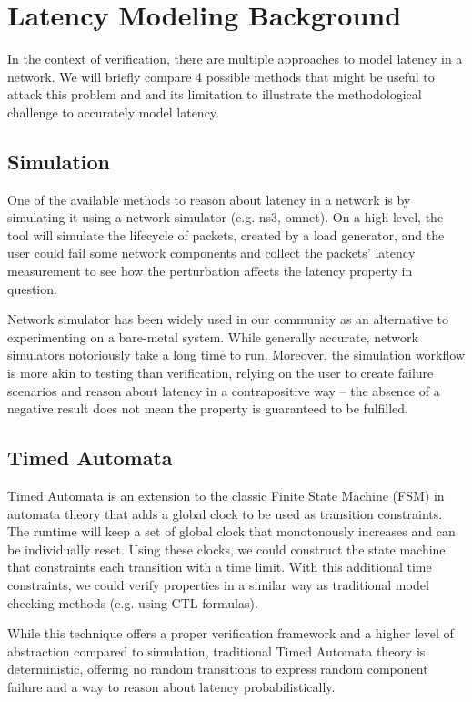 \section{Latency Modeling Background}
In the context of verification, there are multiple approaches to model latency in a network.
We will briefly compare 4 possible methods that might be useful to attack this problem and 
and its limitation to illustrate the methodological challenge to accurately model latency.

\subsection{Simulation}
One of the available methods to reason about latency in a network is by simulating it 
using a network simulator (e.g. ns3, omnet).
On a high level, the tool will simulate the lifecycle of packets, created by a load generator, 
and the user could fail some network components and collect the packets' latency measurement 
to see how the perturbation affects the latency property in question.

Network simulator has been widely used in our community as an alternative to experimenting on 
a bare-metal system. 
While generally accurate, network simulators notoriously take a long time to run.
Moreover, the simulation workflow is more akin to testing than verification, relying on 
the user to create failure scenarios and reason about latency in a contrapositive way -- 
the absence of a negative result does not mean the property is guaranteed to be fulfilled.

\subsection{Timed Automata}
Timed Automata is an extension to the classic Finite State Machine (FSM) in automata theory that 
adds a global clock to be used as transition constraints. 
The runtime will keep a set of global clock that monotonously increases and can be individually 
reset.
Using these clocks, we could construct the state machine that constraints each transition with 
a time limit. 
With this additional time constraints, we could verify properties in a similar way 
as traditional model checking methods (e.g. using CTL formulas).

While this technique offers a proper verification framework and a higher level of abstraction 
compared to simulation, traditional Timed Automata theory is deterministic, offering no random 
transitions to express random component failure and a way to reason about latency probabilistically.

